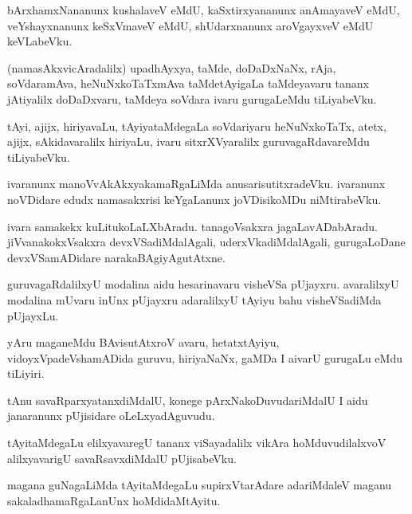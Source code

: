 \documentclass{article}
\begin{document}
\begin{mn}
bArxhamxNananunx kushalaveV eMdU, kaSxtirxyananunx anAmayaveV eMdU, veYshayxnanunx 
keSxVmaveV eMdU, shUdarxnanunx aroVgayxveV eMdU keVLabeVku.
\end{mn}

\begin{mn}
(namasAkxvicAradalilx) upadhAyxya, taMde, doDaDxNaNx, rAja, soVdaramAva, heNuNxkoTaTxmAva 
taMdetAyigaLa taMdeyavaru tananx jAtiyalilx doDaDxvaru, taMdeya soVdara ivaru gurugaLeMdu 
tiLiyabeVku.
\end{mn}

\begin{mn}
tAyi, ajijx, hiriyavaLu, tAyiyataMdegaLa soVdariyaru heNuNxkoTaTx, atetx, ajijx, 
sAkidavaralilx hiriyaLu, ivaru sitxrXVyaralilx guruvagaRdavareMdu tiLiyabeVku.
\end{mn}

\begin{mn}
ivaranunx manoVvAkAkxyakamaRgaLiMda anusarisutitxradeVku. ivaranunx noVDidare edudx 
namasakxrisi keYgaLanunx joVDisikoMDu niMtirabeVku.
\end{mn}

\begin{mn}
ivara samakekx kuLitukoLaLXbAradu. tanagoVsakxra jagaLavADabAradu. jiVvanakokxVsakxra 
devxVSadiMdalAgali, uderxVkadiMdalAgali, gurugaLoDane devxVSamADidare narakaBAgiyAgutAtxne.
\end{mn}

\begin{mn}
guruvagaRdalilxyU modalina aidu hesarinavaru visheVSa pUjayxru. avaralilxyU modalina 
mUvaru inUnx pUjayxru adaralilxyU tAyiyu bahu visheVSadiMda pUjayxLu.
\end{mn}

\begin{mn}
yAru maganeMdu BAvisutAtxroV avaru, hetatxtAyiyu, vidoyxVpadeVshamADida guruvu, hiriyaNaNx, 
gaMDa I aivarU gurugaLu eMdu tiLiyiri.
\end{mn}

\begin{mn}
tAnu savaRparxyatanxdiMdalU, konege pArxNakoDuvudariMdalU I aidu janaranunx pUjisidare 
oLeLxyadAguvudu.
\end{mn}

\begin{mn}
tAyitaMdegaLu elilxyavaregU tananx viSayadalilx vikAra hoMduvudilalxvoV alilxyavarigU 
savaRsavxdiMdalU pUjisabeVku.
\end{mn}

\begin{mn}
magana guNagaLiMda tAyitaMdegaLu supirxVtarAdare adariMdaleV maganu sakaladhamaRgaLanUnx 
hoMdidaMtAyitu.
\end{mn}
\end{document}
